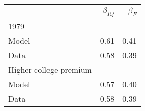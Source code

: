 \begin{tabular}{lrr}
\hline
  & $\beta_{IQ}$  & $\beta_{F}$  \\ 
\hline
1979 &   &   \\ 
Model & 0.61  & 0.41  \\ 
Data & 0.58  & 0.39  \\ 
Higher college premium &   &   \\ 
Model & 0.57  & 0.40  \\ 
Data & 0.58  & 0.39  \\ 
\hline
\end{tabular}%
